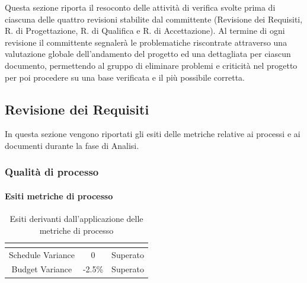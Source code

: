 \appendix
{}
Questa sezione riporta il resoconto delle attività di verifica svolte prima di ciascuna delle quattro revisioni stabilite dal committente (Revisione dei Requisiti, R. di Progettazione, R. di Qualifica e R. di Accettazione).
Al termine di ogni revisione il committente segnalerà le problematiche riscontrate attraverso una valutazione globale dell'andamento del progetto ed una dettagliata per ciascun documento, permettendo al gruppo di eliminare problemi e criticità nel progetto per poi procedere su una base verificata e il più possibile corretta.

\subsection{Revisione dei Requisiti}
In questa sezione vengono riportati gli esiti delle metriche relative ai processi e ai documenti durante la fase di Analisi.
\subsubsection{Qualità di processo}
\paragraph{Esiti metriche di processo} \MiniSpazio
\renewcommand{\arraystretch}{1.5}
\begin{table}[H]
	\begin{center}
		\begin{tabular}{|c|c|c|}
			\hline
			\rowcolor{title_row}
			\textbf{\color{title_text}{Metrica}} & \textbf{\color{title_text}{Valore ottenuto}} & \textbf{\color{title_text}{Esito}} \\
			\hline
			{Schedule Variance} & {0} & {Superato}\\	
			\hline
			{Budget Variance} & {-2.5\%} & {Superato}\\	
			\hline
		\end{tabular}
	\caption[Esiti metriche di processo, Analisi]{Esiti derivanti dall'applicazione delle metriche di processo}	
	\label{tabella: esiti derivanti dall'applicazione delle metriche di processo}
	\end{center}
\end{table}
\renewcommand{\arraystretch}{1}
